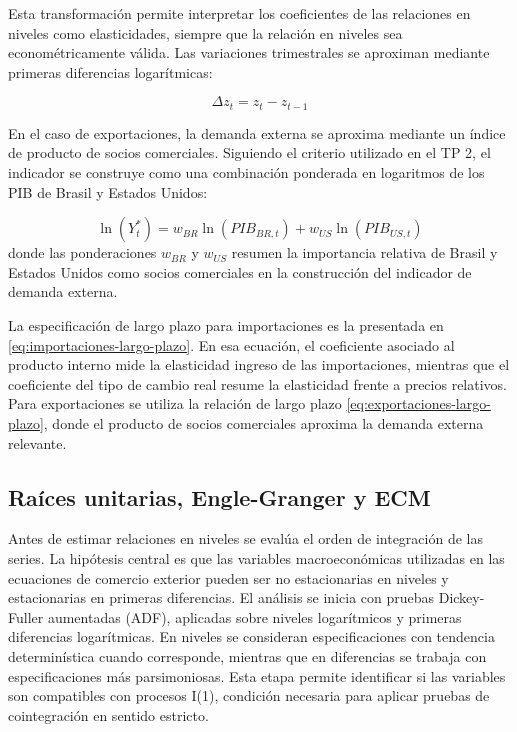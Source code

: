 \documentclass[11pt,a4paper]{article}
\begin{document}
	Esta transformación permite interpretar los coeficientes de las relaciones en
	niveles como elasticidades, siempre que la relación en niveles sea
	econométricamente válida. Las variaciones trimestrales se aproximan mediante
	primeras diferencias logarítmicas:
	
	\begin{equation}
		\Delta z_t = z_t - z_{t-1}
		\label{eq:diferencia-logaritmica}
	\end{equation}
	
	En el caso de exportaciones, la demanda externa se aproxima mediante un índice
	de producto de socios comerciales. Siguiendo el criterio utilizado en el TP 2,
	el indicador se construye como una combinación ponderada en logaritmos de los
	PIB de Brasil y Estados Unidos:
	
	\begin{equation}
		\ln(Y_t^*)
		= w_{BR}\ln(PIB_{BR,t}) + w_{US}\ln(PIB_{US,t})
		\label{eq:tp3-pib-socios}
	\end{equation}
	donde las ponderaciones \(w_{BR}\) y \(w_{US}\) resumen la importancia relativa
	de Brasil y Estados Unidos como socios comerciales en la construcción del
	indicador de demanda externa.
	
	La especificación de largo plazo para importaciones es la presentada en
	\eqref{eq:importaciones-largo-plazo}. En esa ecuación, el coeficiente asociado
	al producto interno mide la elasticidad ingreso de las importaciones, mientras
	que el coeficiente del tipo de cambio real resume la elasticidad frente a
	precios relativos. Para exportaciones se utiliza la relación de largo plazo
	\eqref{eq:exportaciones-largo-plazo}, donde el producto de socios comerciales
	aproxima la demanda externa relevante.
	
	\subsection{Raíces unitarias, Engle-Granger y ECM}
	\label{subsec:metodologia-engle-granger}
	
	Antes de estimar relaciones en niveles se evalúa el orden de integración de las
	series. La hipótesis central es que las variables macroeconómicas utilizadas en
	las ecuaciones de comercio exterior pueden ser no estacionarias en niveles y
	estacionarias en primeras diferencias. El análisis se inicia con pruebas
	Dickey-Fuller aumentadas (ADF), aplicadas sobre niveles logarítmicos y primeras
	diferencias logarítmicas. En niveles se consideran especificaciones con
	tendencia determinística cuando corresponde, mientras que en diferencias se
	trabaja con especificaciones más parsimoniosas. Esta etapa permite identificar
	si las variables son compatibles con procesos I(1), condición necesaria para
	aplicar pruebas de cointegración en sentido estricto.
	
\end{document}
